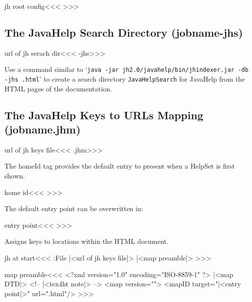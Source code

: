 \<jh root config\><<<
\edef\tocLabel{\ifx\contentsname\:UnDef Table Of Contents\else
               \ifx\contentsname\empty  Table Of Contents\else 
               \contentsname\fi\fi}
\edef\indexLabel{\ifx\indexname\:UnDef Index\else
                 \ifx\indexname\empty  Index\else \indexname\fi\fi}
   {\edef\titleLabel{\LikeRef{TITLE+}}}
   {\def\titleLabel{\jobname}}
>>>



\subsection{The JavaHelp Search Directory (jobname-jhs)}


\<url of jh serach dir\><<<
\jobname-jhs>>>

\def\JHINDEXER{java -jar
\JHDIR jh2.0/javahelp/bin/jhindexer.jar
    -db \jobname-jhs \jobname*.html}




Use a  command similar to `{\tt \JHINDEXER}'
to create a search directory \verb+JavaHelpSearch+ for JavaHelp from the HTML pages of the documentation.





\subsection{The JavaHelp Keys to URLs Mapping (jobname.jhm)}



\<url of jh keys file\><<<
\jobname.jhm>>>


The homeId tag provides the default entry to present when a HelpSet is
first shown.

\<home id\><<<
\jobname>>>                

The default  entry point can be overwritten in:

\<entry point\><<<
\jobname>>>



Assigns keys to locations within the HTML document.



\<jh at start\><<<
\Write:File
   {|<url of jh keys file|>}
   {|<map preamble|>}
>>>


\<map preamble\><<<
<?xml version="1.0" encoding="ISO-8859-1" ?>\Hnewline
|<map DTD|>
\Hnewline <!-- |<tex4ht note|> -->\Hnewline
<map version="\dotVersion">\Hnewline
<mapID target="|<entry point|>" url="\jobname.html"/>\Hnewline
>>>


